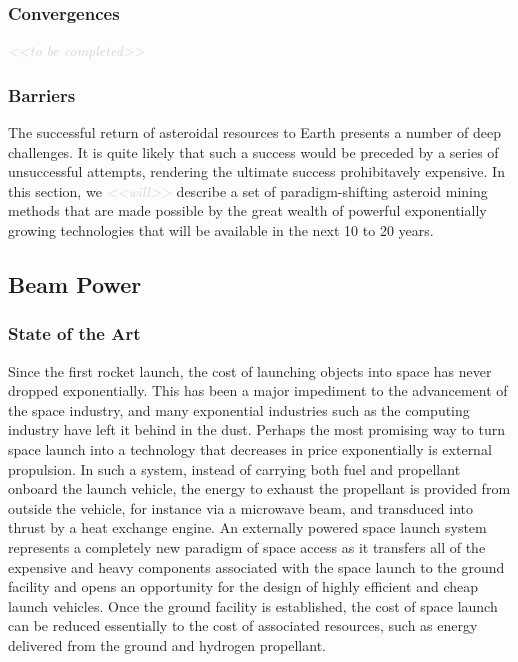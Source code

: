 \documentclass[letter,11pt]{article}
\newcommand{\todo}[1]{\textcolor{lightgray}{\textit{<<#1>>}}}
\newcommand{\tbc}{\begin{center} \todo{to be completed} \end{center}}
\newcommand{\tbcsubsubsection}[1]{ \refstepcounter{subsubsection}%
  \subsubsection*{\thesubsubsection \quad #1} \tbc}
\begin{document}
\tbcsubsubsection{Convergences}

\subsubsection{Barriers}

The successful return of asteroidal resources to Earth presents a number of
deep challenges.  It is quite likely that such a success would be preceded by a
series of unsuccessful attempts, rendering the ultimate success prohibitavely
expensive.  In this section, we \todo{will} describe a set of paradigm-shifting
asteroid mining methods that are made possible by the great wealth of powerful
exponentially growing technologies that will be available in the next 10 to 20
years.

\subsection{Beam Power}

\subsubsection{State of the Art}

Since the first rocket launch, the cost of launching objects into space has
never dropped exponentially.  This has been a major impediment to the
advancement of the space industry, and many exponential industries such as the
computing industry have left it behind in the dust.  Perhaps the most promising
way to turn space launch into a technology that decreases in price
exponentially is external propulsion. In such a system, instead of carrying
both fuel and propellant onboard the launch vehicle, the energy to exhaust the
propellant is provided from outside the vehicle, for instance via a microwave
beam, and transduced into thrust by a heat exchange engine. An externally
powered space launch system represents a completely new paradigm of space
access as it transfers all of the expensive and heavy components associated
with the space launch to the ground facility and opens an opportunity for the
design of highly efficient and cheap launch vehicles. Once the ground facility
is established, the cost of space launch can be reduced essentially to the cost
of associated resources, such as energy delivered from the ground and hydrogen
propellant.
\end{document}
